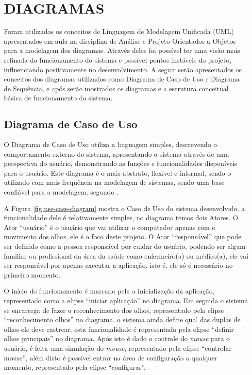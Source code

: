 \section{DIAGRAMAS}\label{Sub:diagramas}
Foram utilizados os conceitos de Linguagem de Modelagem Unificada (UML) apresentados em aula na disciplina de Análise e Projeto Orientados a Objetos para a modelagem dos diagramas. Através deles foi possível ter uma visão mais refinada do funcionamento do sistema e possível pontos instáveis do projeto, influenciando positivamente no desenvolvimento. A seguir serão apresentados os conceitos dos diagramas utilizados como Diagrama de Caso de Uso e Diagrama de Sequência, e após serão mostrados os diagramas e a estrutura conceitual básica de funcionamento do sistema. 

\subsection{Diagrama de Caso de Uso}
O Diagrama de Caso de Uso utiliza a linguagem simples, descrevendo o comportamento externo do sistema, apresentando o sistema através de uma perspectiva do usuário, demonstrando as funções e funcionalidades disponíveis para o usuário. Este diagrama é o mais abstrato, flexível e informal, sendo o utilizado com mais frequência na modelagem de sistemas, sendo uma base confiável para a modelagem, segundo . 

A Figura \ref{fig:use-case-diagram} mostra o Caso de Uso do sistema desenvolvido, a funcionalidade dele é relativamente simples, no diagrama temos dois Atores. O Ator “usuário” é o usuário que vai utilizar o computador apenas com o movimento dos olhos, ele é o foco deste projeto. O Ator “responsável” que pode ser definido como a pessoa responsável por cuidar do usuário, podendo ser algum familiar ou profissional da área da saúde como enfermeiro(a) ou médico(a), ele vai ser responsável por apenas executar a aplicação, isto é, ele só é necessário no primeiro momento. 

O início do funcionamento é marcado pela a inicialização da aplicação, representado como a elipse “iniciar aplicação” no diagrama. Em seguida o sistema se encarrega de fazer o reconhecimento dos olhos, representado pela elipse “reconhecimento olhos” no diagrama, o sistema ainda define qual das duplas de olhos ele deve rastrear, esta funcionalidade é representada pela elipse “definir olhos principais” no diagrama.  Após isto é dado o controle do \textit{mouse} para o usuário, é feita uma simulação do \textit{mouse}, representado pela elipse “controlar mouse”, além disto é possível entrar na área de configuração a qualquer momento, representado pela elipse “configurar”.

